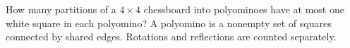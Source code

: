 How many partitions of a $4\times4$ chessboard into polyominoes have at most one white square in each polyomino? A polyomino is a nonempty set of squares connected by shared edges. Rotations and reflections are counted separately.

